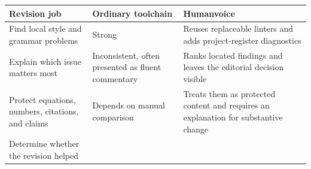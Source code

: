 \documentclass[
  11pt,
  english,
]{article}
\begin{document}
\begin{longtable}[]{@{}lll@{}}
\toprule
\begin{minipage}[b]{0.30\columnwidth}\raggedright
Revision job\strut
\end{minipage} & \begin{minipage}[b]{0.30\columnwidth}\raggedright
Ordinary toolchain\strut
\end{minipage} & \begin{minipage}[b]{0.30\columnwidth}\raggedright
Humanvoice\strut
\end{minipage}\tabularnewline
\midrule
\endhead
\begin{minipage}[t]{0.30\columnwidth}\raggedright
Find local style and grammar problems\strut
\end{minipage} & \begin{minipage}[t]{0.30\columnwidth}\raggedright
Strong\strut
\end{minipage} & \begin{minipage}[t]{0.30\columnwidth}\raggedright
Reuses replaceable linters and adds project-register diagnostics\strut
\end{minipage}\tabularnewline
\begin{minipage}[t]{0.30\columnwidth}\raggedright
Explain which issue matters most\strut
\end{minipage} & \begin{minipage}[t]{0.30\columnwidth}\raggedright
Inconsistent, often presented as fluent commentary\strut
\end{minipage} & \begin{minipage}[t]{0.30\columnwidth}\raggedright
Ranks located findings and leaves the editorial decision visible\strut
\end{minipage}\tabularnewline
\begin{minipage}[t]{0.30\columnwidth}\raggedright
Protect equations, numbers, citations, and claims\strut
\end{minipage} & \begin{minipage}[t]{0.30\columnwidth}\raggedright
Depends on manual comparison\strut
\end{minipage} & \begin{minipage}[t]{0.30\columnwidth}\raggedright
Treats them as protected content and requires an explanation for
substantive change\strut
\end{minipage}\tabularnewline
\begin{minipage}[t]{0.30\columnwidth}\raggedright
Determine whether the revision helped\strut
\end{minipage} & \begin{minipage}[t]{0.30\columnwidth}\raggedright

\end{minipage}
\end{longtable}
\end{document}
